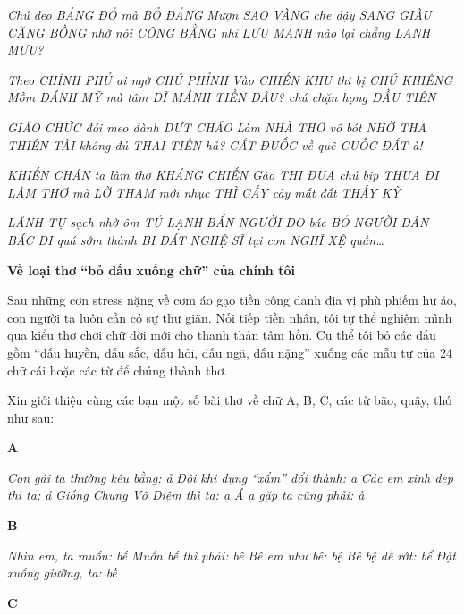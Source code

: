 \documentclass[../main.tex]{subfiles}
\begin{document}
\begin{multicols}{2}
\begin{blockquote}
\textit{Chú đeo BẢNG ĐỎ  mà BỎ ĐẢNG}        
\textit{Mượn SAO VÀNG che đậy SANG GIÀU}        
\textit{CĂNG BỒNG nhờ nói CÔNG BẰNG nhỉ} 
\textit{LƯU MANH nào lại chẳng LANH MƯU?} 
        
\textit{Theo CHÍNH PHỦ ai ngờ CHÚ PHỈNH}        
\textit{Vào CHIẾN KHU thì bị CHÚ KHIÊNG}        
\textit{Mồm ĐÁNH MỸ mà tâm ĐĨ MÁNH} 
\textit{TIỀN ĐÂU? chú chặn họng ĐẦU TIÊN} 
        
\textit{GIÁO CHỨC đói meo đành DỨT CHÁO}        
\textit{Làm NHÀ THƠ vô bót NHỜ THA}        
\textit{THIÊN TÀI không đủ THAI TIỀN hả?} 
\textit{CẤT ĐUỐC về quê CUỐC ĐẤT à!} 
        
\textit{KHIẾN CHÁN ta làm thơ KHÁNG CHIẾN}        
\textit{Gào THI ĐUA chú bịp THUA ĐI}        
\textit{LÀM THƠ mà LỜ THAM mới nhục} 
\textit{THÌ CẤY cày mất đất THẤY KỲ} 
        
\textit{LÃNH TỤ sạch nhờ ôm TỦ LẠNH}        
\textit{BẨN NGƯỜI DO bác BỎ NGƯỜI DÂN}        
\textit{BÁC ĐI quá sớm thành BI ĐÁT} 
\textit{NGHỆ SĨ tụi con NGHĨ XỆ quần…} 

\end{blockquote}

\textit{		} 
 
\textbf{Về loại thơ “bỏ dấu xuống chữ” của chính tôi} 
 
Sau những cơn stress nặng về cơm áo gạo tiền công danh địa vị phù phiếm hư ảo, con người ta luôn cần có sự thư giãn. Nối tiếp tiền nhân, tôi tự thể nghiệm mình qua kiểu thơ chơi chữ đời mới cho thanh thản tâm hồn. Cụ thể tôi bỏ các dấu gồm “dấu huyền, dấu sắc, dấu hỏi, dấu ngã, dấu nặng” xuống các mẫu tự của 24 chữ cái hoặc các từ để chúng thành thơ. 
 
Xin giới thiệu cùng các bạn một số bài thơ về chữ A, B, C, các từ bão, quậy, thớ như sau: 
\begin{blockquote}
 
\textbf{A} 
        
\textit{Con gái ta thường kêu bằng: ả}        
\textit{Ðôi khi đụng “xẩm” đổi thành: a}        
\textit{Các em xinh đẹp thì ta: á}        
\textit{Giống Chung Vô Diệm thì ta: ạ} 
\textit{Á ạ gặp ta cũng phải: à} 
 
\textbf{B} 
        
\textit{Nhìn em, ta muốn: bế}        
\textit{Muốn bế thì phải: bê}        
\textit{Bê em như bê: bệ}        
\textit{Bê bệ dễ rớt: bể} 
\textit{Ðặt xuống giường, ta: bề} 
 
\textbf{C} 
        

\end{blockquote}
\end{multicols}
\end{document}
